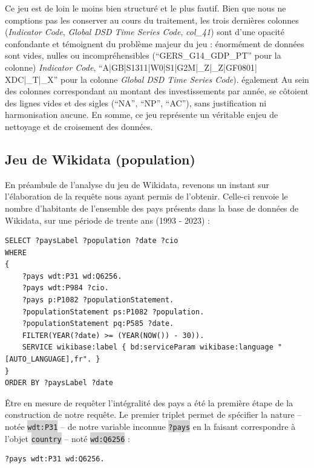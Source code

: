 \documentclass[hidelinks, 12pt]{report}
\newcommand{\code}[1]{\colorbox{LightGray}{\texttt{#1}}}
\begin{document}
Ce jeu est de loin le moins bien structuré et le plus fautif. Bien que nous ne comptions pas les conserver au cours du traitement, les trois dernières colonnes (\textit{Indicator Code}, \textit{Global DSD Time Series Code}, \textit{col\_41}) sont d'une opacité confondante et témoignent du problème majeur du jeu : énormément de données sont vides, nulles ou incompréhensibles (\enquote{GERS\_G14\_GDP\_PT} pour la colonne) \textit{Indicator Code}, \enquote{A|GB|S1311|W0|S1|G2M|\_Z|\_Z|GF0801|
	XDC|\_T|\_X} pour la colonne \textit{Global DSD Time Series Code}).
également
Au sein des colonnes correspondant au montant des investissements par année, se côtoient des lignes vides et des sigles (\enquote{NA}, \enquote{NP}, \enquote{AC}), sans justification ni harmonisation aucune. En somme, ce jeu représente un véritable enjeu de nettoyage et de croisement des données.





%





\subsection{Jeu de Wikidata (population)}

En préambule de l'analyse du jeu de Wikidata, revenons un instant sur l'élaboration de la requête nous ayant permis de l'obtenir. Celle-ci renvoie le nombre d'habitants de l'ensemble des pays présents dans la base de données de Wikidata, sur une période de trente ans (1993 - 2023) :

\label{query1}\begin{lstlisting}[language=SPARQL]
SELECT ?paysLabel ?population ?date ?cio
WHERE 
{
	?pays wdt:P31 wd:Q6256.
	?pays wdt:P984 ?cio.
	?pays p:P1082 ?populationStatement.
	?populationStatement ps:P1082 ?population. 
	?populationStatement pq:P585 ?date.
	FILTER(YEAR(?date) >= (YEAR(NOW()) - 30)).
	SERVICE wikibase:label { bd:serviceParam wikibase:language "[AUTO_LANGUAGE],fr". }
}
ORDER BY ?paysLabel ?date
\end{lstlisting}

Être en mesure de requêter l'intégralité des pays a été la première étape de la construction de notre requête. Le premier triplet permet de spécifier la nature -- notée \code{wdt:P31} -- de notre variable inconnue \code{?pays} en la faisant correspondre à l'objet \code{country} -- noté \code{wd:Q6256} :

\begin{lstlisting}[language=SPARQL]
	?pays wdt:P31 wd:Q6256.
\end{lstlisting}
\end{document}
